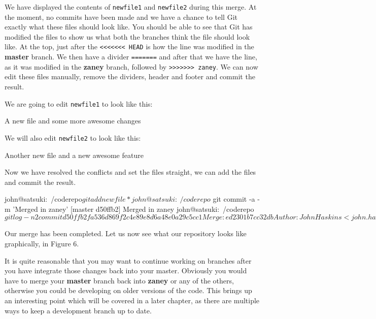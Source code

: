 We have displayed the contents of \texttt{newfile1} and \texttt{newfile2} during this merge.
At the moment, no commits have been made and we have a chance to tell Git exactly what these files should look like.
You should be able to see that Git has modified the files to show us what both the branches think the file should look like.
At the top, just after the \texttt{<<<<<<< HEAD} is how the line was modified in the \textbf{master} branch.
We then have a divider \texttt{=======} and after that we have the line, as it was modified in the \textbf{zaney} branch, followed by \texttt{>>>>>>> zaney}.
We can now edit these files manually, remove the dividers, header and footer and commit the result.

We are going to edit \texttt{newfile1} to look like this:

\begin{code}
A new file
and some more awesome changes
\end{code}

We will also edit \texttt{newfile2} to look like this:

\begin{code}
Another new file
and a new awesome feature
\end{code}

Now we have resolved the conflicts and set the files straight, we can add the files and commit the result.

\begin{code}
john@satsuki:~/coderepo$ git add newfile*
john@satsuki:~/coderepo$ git commit -a -m 'Merged in zaney'
[master d50ffb2] Merged in zaney
john@satsuki:~/coderepo$ git log -n2
commit d50ffb2fa536d869f2c4e89e8d6a48e0a29c5cc1
Merge: ed2301b 7cc32db
Author: John Haskins <john.haskins@tamagoyakiinc.koala>
Date:   Fri Apr 1 07:42:04 2011 +0100

    Merged in zaney

commit ed2301ba223a63a5a930b536a043444e019460a7
Author: John Haskins <john.haskins@tamagoyakiinc.koala>
Date:   Fri Apr 1 07:37:34 2011 +0100

    Removed third file
john@satsuki:~/coderepo$
\end{code}

Our merge has been completed.
Let us now see what our repository looks like graphically, in Figure 6.


It is quite reasonable that you may want to continue working on branches after you have integrate those changes back into your master.
Obviously you would have to merge your \textbf{master} branch back into \textbf{zaney} or any of the others, otherwise you could be developing on older versions of the code.
This brings up an interesting point which will be covered in a later chapter, as there are multiple ways to keep a development branch up to date.

